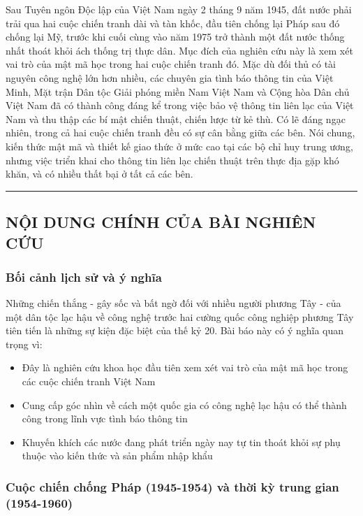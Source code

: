 Sau Tuyên ngôn Độc lập của Việt Nam ngày 2 tháng 9 năm 1945, đất nước phải trải qua hai cuộc chiến tranh dài và tàn khốc, đầu tiên chống lại Pháp sau đó chống lại Mỹ, trước khi cuối cùng vào năm 1975 trở thành một đất nước thống nhất thoát khỏi ách thống trị thực dân. Mục đích của nghiên cứu này là xem xét vai trò của mật mã học trong hai cuộc chiến tranh đó. Mặc dù đối thủ có tài nguyên công nghệ lớn hơn nhiều, các chuyên gia tình báo thông tin của Việt Minh, Mặt trận Dân tộc Giải phóng miền Nam Việt Nam và Cộng hòa Dân chủ Việt Nam đã có thành công đáng kể trong việc bảo vệ thông tin liên lạc của Việt Nam và thu thập các bí mật chiến thuật, chiến lược từ kẻ thù. Có lẽ đáng ngạc nhiên, trong cả hai cuộc chiến tranh đều có sự cân bằng giữa các bên. Nói chung, kiến thức mật mã và thiết kế giao thức ở mức cao tại các bộ chỉ huy trung ương, nhưng việc triển khai cho thông tin liên lạc chiến thuật trên thực địa gặp khó khăn, và có nhiều thất bại ở tất cả các bên.

\vspace{0.5cm}
\rule{\textwidth}{1pt}
\vspace{0.5cm}

\subsection{NỘI DUNG CHÍNH CỦA BÀI NGHIÊN CỨU}

\subsubsection{Bối cảnh lịch sử và ý nghĩa}

Những chiến thắng - gây sốc và bất ngờ đối với nhiều người phương Tây - của một dân tộc lạc hậu về công nghệ trước hai cường quốc công nghiệp phương Tây tiên tiến là những sự kiện đặc biệt của thế kỷ 20. Bài báo này có ý nghĩa quan trọng vì:

\begin{itemize}
\item Đây là nghiên cứu khoa học đầu tiên xem xét vai trò của mật mã học trong các cuộc chiến tranh Việt Nam
\item Cung cấp góc nhìn về cách một quốc gia có công nghệ lạc hậu có thể thành công trong lĩnh vực tình báo thông tin
\item Khuyến khích các nước đang phát triển ngày nay tự tin thoát khỏi sự phụ thuộc vào kiến thức và sản phẩm nhập khẩu
\end{itemize}

\subsubsection{Cuộc chiến chống Pháp (1945-1954) và thời kỳ trung gian (1954-1960)}

